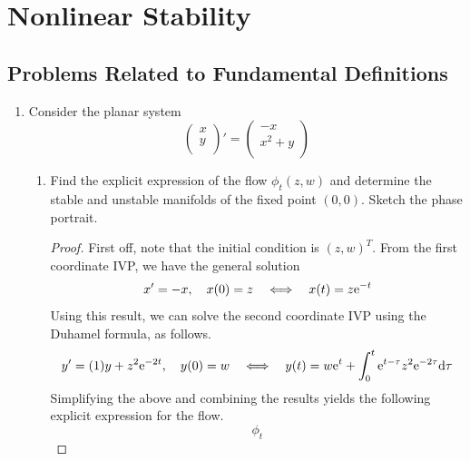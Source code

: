 \documentclass[../psets.tex]{subfiles}
\begin{document}
\section{Nonlinear Stability}
\subsection*{Problems Related to Fundamental Definitions}
\begin{enumerate}
    \item {}Consider the planar system
    \begin{equation*}
        \begin{pmatrix}
            x\\
            y\\
        \end{pmatrix}'
        =
        \begin{pmatrix}
            -x\\
            x^2+y\\
        \end{pmatrix}
    \end{equation*}
    \begin{enumerate}
        \item Find the explicit expression of the flow $\phi_t(z,w)$ and determine the stable and unstable manifolds of the fixed point $(0,0)$. Sketch the phase portrait.
        \begin{proof}
            First off, note that the initial condition is $(z,w)^T$. From the first coordinate IVP, we have the general solution
            \begin{equation*}
                x' = -x
                ,\quad
                x(0) = z
                \quad\Longleftrightarrow\quad
                x(t) = z\e[-t]
            \end{equation*}
            Using this result, we can solve the second coordinate IVP using the Duhamel formula, as follows.
            \begin{equation*}
                y' = (1)y+z^2\e[-2t]
                ,\quad
                y(0) = w
                \quad\Longleftrightarrow\quad
                y(t) = w\e[t]+\int_0^t\e[t-\tau]z^2\e[-2\tau]\dd\tau
            \end{equation*}
            Simplifying the above and combining the results yields the following explicit expression for the flow.
            \begin{equation*}
                \boxed{
                    \phi_t
}
\end{equation*}
\end{proof}
\end{enumerate}
\end{enumerate}
\end{document}
